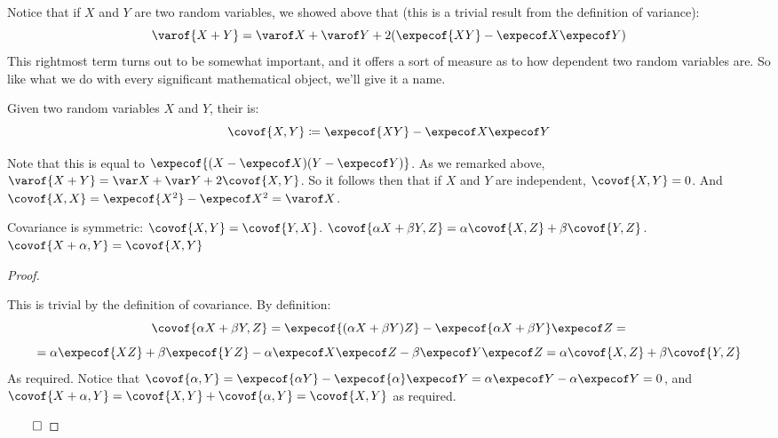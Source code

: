 \newpage
Notice that if $X$ and $Y$ are two random variables, we showed above that (this is a trivial result from the definition of variance):
\[ \varof{X+Y} = \varof X+\varof Y + 2(\expecof{XY} - \expecof X\expecof Y) \]
This rightmost term turns out to be somewhat important, and it offers a sort of measure as to how dependent two random variables are.
So like what we do with every significant mathematical object, we'll give it a name.

\begin{defn*}

	Given two random variables $X$ and $Y$, their  is:
	\[ \covof{X,Y} \coloneqq \expecof{XY} - \expecof X\expecof Y \]

\end{defn*}

Note that this is equal to $\expecof{(X-\expecof X)(Y-\expecof Y)}$.
As we remarked above, $\varof{X+Y}=\var X+\var Y+2\covof{X,Y}$.
So it follows then that if $X$ and $Y$ are independent, $\covof{X,Y}=0$.
And $\covof{X,X}=\expecof{X^2}-\expecof X^2=\varof X$.

\begin{thrm*}

	\begin{msecenumerate}[0pt]
		\mitem Covariance is symmetric: $\covof{X,Y}=\covof{Y,X}$.
		\mitem $\covof{\alpha X+\beta Y, Z} = \alpha\covof{X,Z} + \beta\covof{Y,Z}$.
		\mitem $\covof{X+\alpha,Y}=\covof{X,Y}$
	\end{msecenumerate}

\end{thrm*}

\begin{proof}

	\begin{msecenumerate}[0pt]
		\mitem This is trivial by the definition of covariance.
		\mitem By definition:
		\[ \covof{\alpha X+\beta Y,Z} = \expecof{(\alpha X+\beta Y)Z} - \expecof{\alpha X+\beta Y}\expecof Z = \]
		\[ = \alpha\expecof{XZ} + \beta\expecof{YZ} - \alpha\expecof X\expecof Z - \beta\expecof Y\expecof Z =
		\alpha\covof{X,Z} + \beta\covof{Y,Z} \]
		As required.
		\mitem Notice that $\covof{\alpha,Y}=\expecof{\alpha Y}-\expecof{\alpha}\expecof Y=\alpha\expecof Y-\alpha\expecof Y=0$,
		and $\covof{X+\alpha,Y}=\covof{X,Y}+\covof{\alpha,Y}=\covof{X,Y}$ as required.
	\end{msecenumerate}

	\hfill$\qed$

\end{proof}

